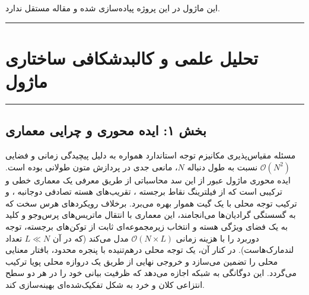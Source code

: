 \clearpage
{}
\vspace*{0.2cm}

این ماژول در این پروژه پیاده‌سازی شده و مقاله مستقل ندارد.
\noindent\rule{\textwidth}{1.2pt}
\vspace*{0.1cm}
\section{تحلیل علمی و کالبدشکافی ساختاری ماژول }
\label{sec:mod_leka_v2}
\vspace*{-0.2cm}
\noindent\rule{\textwidth}{0.5pt}
\vspace*{0.3cm}

\subsection*{بخش ۱: ایده محوری و چرایی معماری }
مسئله مقیاس‌پذیری مکانیزم توجه استاندارد  همواره به دلیل پیچیدگی زمانی و فضایی $\mathcal{O}(N^2)$ نسبت به طول دنباله $N$، مانعی جدی در پردازش متون طولانی بوده است. ایده محوری ماژول   عبور از این سد محاسباتی از طریق معرفی یک معماری خطی و ترکیبی است که از فیلترینگ نقاط برجسته ، تقریب‌های هسته تصادفی دوجانبه ، و ترکیب توجه محلی  با یک گیت هموار بهره می‌برد.
برخلاف رویکردهای هرس سخت  که به گسستگی گرادیان‌ها می‌انجامند، این معماری با انتقال ماتریس‌های پرس‌وجو و کلید به یک فضای ویژگی هسته  و انتخاب زیرمجموعه‌ای ثابت از توکن‌های برجسته، توجه دوربرد  را با هزینه زمانی $\mathcal{O}(N \times L)$ مدل می‌کند (که در آن $L \ll N$ تعداد لندمارک‌هاست). در کنار آن، یک توجه محلی درهم‌تنیده با پنجره محدود، بافتار معنایی محلی را تضمین می‌سازد و خروجی نهایی از طریق یک دروازه محلی  پویا ترکیب می‌گردد. این دوگانگی به شبکه اجازه می‌دهد که ظرفیت بیانی خود را در هر دو سطح انتزاعی کلان و خرد به شکل تفکیک‌شده‌ای بهینه‌سازی کند.

